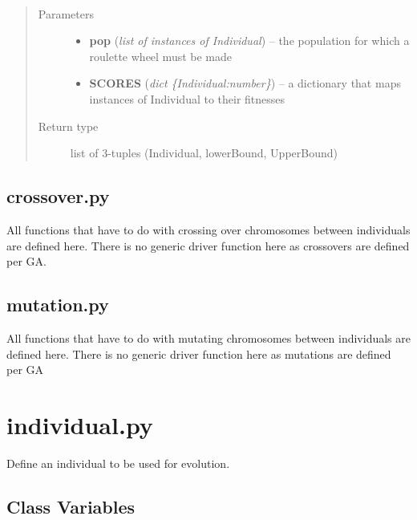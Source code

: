 \documentclass[letterpaper,10pt,english]{sphinxmanual}
\begin{document}
\begin{fulllineitems}
\label{Overview:getRouletteWheel}~\begin{quote}\begin{description}
\item[{Parameters}] \leavevmode\begin{itemize}
\item {} 
\textbf{pop} (\emph{list of instances of Individual}) -- the population for which a roulette wheel must be made

\item {} 
\textbf{SCORES} (\emph{dict \{Individual:number\}}) -- a dictionary that maps instances of Individual to their fitnesses

\end{itemize}

\item[{Return type}] \leavevmode
list of 3-tuples (Individual, lowerBound, UpperBound)

\end{description}\end{quote}

\end{fulllineitems}



\section{crossover.py}
\label{Overview:crossover-py}
All functions that have to do with crossing over chromosomes between individuals are defined here. There is no generic driver function here as crossovers are defined per GA.


\section{mutation.py}
\label{Overview:mutation-py}
All functions that have to do with mutating chromosomes between individuals are defined here. There is no generic driver function here as mutations are defined per GA


\chapter{individual.py}
\label{individual.py:individual-py}\label{individual.py::doc}
Define an individual to be used for evolution.


\section{Class Variables}
\label{individual.py:class-variables}
\end{document}
